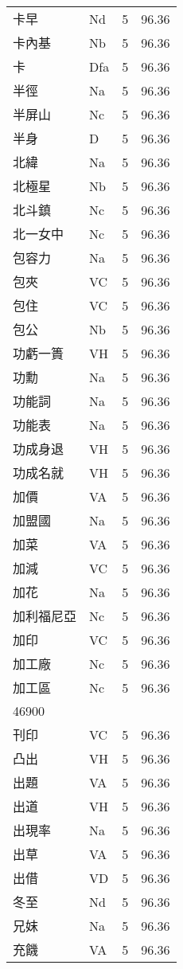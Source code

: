 \documentclass[twocolumn]{book}
\begin{document}
\begin{supertabular}{llrr}
卡早 & Nd & 5 &  96.36\\
卡內基 & Nb & 5 &  96.36\\
卡 & Dfa & 5 &  96.36\\
半徑 & Na & 5 &  96.36\\
半屏山 & Nc & 5 &  96.36\\
半身 & D & 5 &  96.36\\
北緯 & Na & 5 &  96.36\\
北極星 & Nb & 5 &  96.36\\
北斗鎮 & Nc & 5 &  96.36\\
北一女中 & Nc & 5 &  96.36\\
包容力 & Na & 5 &  96.36\\
包夾 & VC & 5 &  96.36\\
包住 & VC & 5 &  96.36\\
包公 & Nb & 5 &  96.36\\
功虧一簣 & VH & 5 &  96.36\\
功勳 & Na & 5 &  96.36\\
功能詞 & Na & 5 &  96.36\\
功能表 & Na & 5 &  96.36\\
功成身退 & VH & 5 &  96.36\\
功成名就 & VH & 5 &  96.36\\
加價 & VA & 5 &  96.36\\
加盟國 & Na & 5 &  96.36\\
加菜 & VA & 5 &  96.36\\
加減 & VC & 5 &  96.36\\
加花 & Na & 5 &  96.36\\
加利福尼亞 & Nc & 5 &  96.36\\
加印 & VC & 5 &  96.36\\
加工廠 & Nc & 5 &  96.36\\
加工區 & Nc & 5 &  96.36\\
46900\\
刊印 & VC & 5 &  96.36\\
凸出 & VH & 5 &  96.36\\
出題 & VA & 5 &  96.36\\
出道 & VH & 5 &  96.36\\
出現率 & Na & 5 &  96.36\\
出草 & VA & 5 &  96.36\\
出借 & VD & 5 &  96.36\\
冬至 & Nd & 5 &  96.36\\
兄妺 & Na & 5 &  96.36\\
充饑 & VA & 5 &  96.36\\

\end{supertabular}
\end{document}

